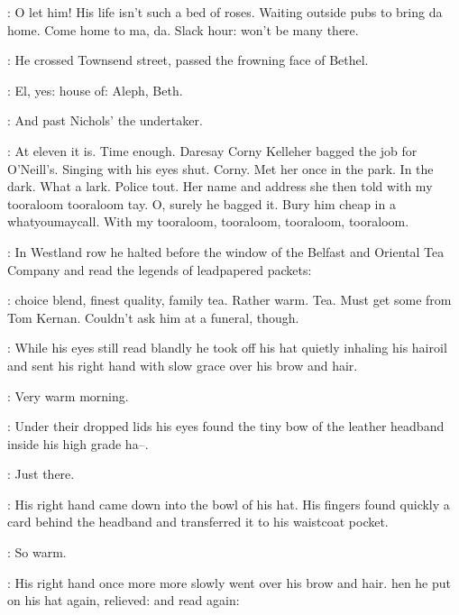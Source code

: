 \BloomInt:
O let him!
His life isn't such a bed of roses.
Waiting outside pubs to bring da home.
Come home to ma, da.
Slack hour: won't be many there.

:
He crossed Townsend street,
passed the frowning face of Bethel.

\BloomInt:
El, yes:
house of: Aleph, Beth.

:
And past Nichols' the undertaker.

\BloomInt:
At eleven it is.
Time enough.
Daresay Corny Kelleher bagged the job for O'Neill's.
Singing with his eyes shut.
Corny.
Met her once in the park.
In the dark.
What a lark.
Police tout.
Her name and address she then told
with my tooraloom tooraloom tay.
O, surely he bagged it.
Bury him cheap in a whatyoumaycall.
With my tooraloom, tooraloom, tooraloom, tooraloom.

:
In Westland row
he halted before the window of the Belfast and Oriental Tea Company
and read the legends of leadpapered packets:

\BloomInt:
choice blend, finest quality, family tea.
Rather warm.
Tea.
Must get some from Tom Kernan.
Couldn't ask him at a funeral, though.

:
While his eyes still read blandly
he took off his hat
quietly inhaling his hairoil
and sent his right hand with slow grace over his brow and hair.

\BloomInt:
Very warm morning.

:
Under their dropped lids
his eyes found the tiny bow of the leather headband inside his high grade ha--.

\BloomInt:
Just there.

:
His right hand came down into the bowl of his hat.
His fingers found quickly a card behind the headband
and transferred it to his waistcoat pocket.

\BloomInt:
So warm.

:
His right hand once more more slowly went over his brow and hair. 
hen he put on his hat again, relieved:
and read again:

